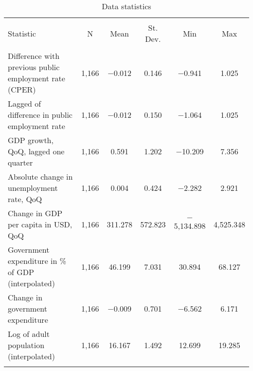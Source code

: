 
\begin{table}[!htbp] \centering 
  \caption{Data statistics} 
  \label{} 
\footnotesize 
\begin{tabular}{@{\extracolsep{5pt}}lccccc} 
\\[-1.8ex]\hline 
\hline \\[-1.8ex] 
Statistic & \multicolumn{1}{c}{N} & \multicolumn{1}{c}{Mean} & \multicolumn{1}{c}{St. Dev.} & \multicolumn{1}{c}{Min} & \multicolumn{1}{c}{Max} \\ 
\hline \\[-1.8ex] 
Difference with previous public employment rate (CPER) & 1,166 & $-$0.012 & 0.146 & $-$0.941 & 1.025 \\ 
Lagged of difference in public employment rate & 1,166 & $-$0.012 & 0.150 & $-$1.064 & 1.025 \\ 
GDP growth, QoQ, lagged one quarter & 1,166 & 0.591 & 1.202 & $-$10.209 & 7.356 \\ 
Absolute change in unemployment rate, QoQ & 1,166 & 0.004 & 0.424 & $-$2.282 & 2.921 \\ 
Change in GDP per capita in USD, QoQ & 1,166 & 311.278 & 572.823 & $-$5,134.898 & 4,525.348 \\ 
Government expenditure in \% of GDP (interpolated) & 1,166 & 46.199 & 7.031 & 30.894 & 68.127 \\ 
Change in government expenditure & 1,166 & $-$0.009 & 0.701 & $-$6.562 & 6.171 \\ 
Log of adult population (interpolated) & 1,166 & 16.167 & 1.492 & 12.699 & 19.285 \\ 
\hline \\[-1.8ex] 
\end{tabular} 
\end{table} 
